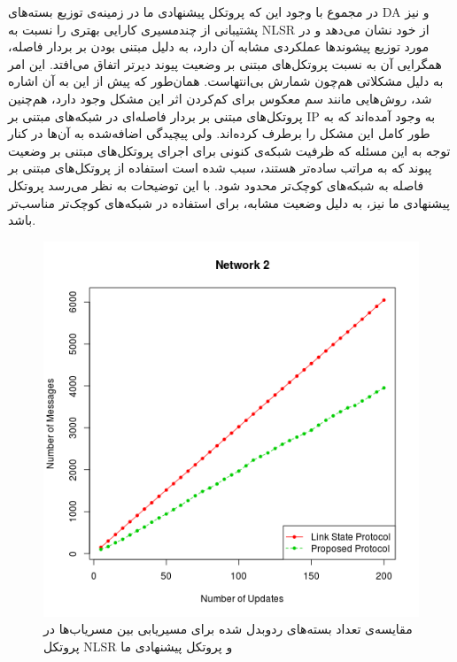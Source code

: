 در مجموع با وجود این که پروتکل پیشنهادی ما در زمینه‌ی توزیع بسته‌های DA و نیز پشتیبانی از چندمسیری کارایی بهتری را نسبت به NLSR از خود نشان می‌دهد و در مورد توزیع پیشوندها عملکردی مشابه آن دارد، به دلیل مبتنی بودن بر بردار فاصله، همگرایی آن به نسبت پروتکل‌های مبتنی بر وضعیت پیوند دیرتر اتفاق می‌افتد. این امر به دلیل مشکلاتی هم‌چون شمارش بی‌انتهاست. همان‌طور که پیش از این به آن اشاره شد، روش‌هایی مانند سم معکوس برای کم‌کردن اثر این مشکل وجود دارد، هم‌چنین پروتکل‌های مبتنی بر بردار فاصله‌ای در شبکه‌های مبتنی بر IP به وجود آمده‌اند که به طور کامل این مشکل را برطرف کرده‌اند. ولی پیچیدگی اضافه‌شده به آن‌ها در کنار توجه به این مسئله که ظرفیت شبکه‌ی کنونی برای اجرای پروتکل‌های مبتنی بر وضعیت پبوند که به مراتب ساده‌تر هستند، سبب شده است استفاده از پروتکل‌های مبتنی بر فاصله به شبکه‌های کوچک‌تر محدود شود. با این توضیحات به نظر می‌رسد پروتکل پیشنهادی ما نیز، به دلیل وضعیت مشابه، برای استفاده در شبکه‌های کوچک‌تر مناسب‌تر باشد.
\begin{figure}[h!]
\centering
\includegraphics[scale=0.7]{./resources/figures/Test2.png}
\caption{مقایسه‌ی تعداد بسته‌های ردوبدل شده برای مسیریابی بین مسریاب‌ها در پروتکل NLSR و پروتکل پیشنهادی ما}
\label{fig:Plot2}
\end{figure}


